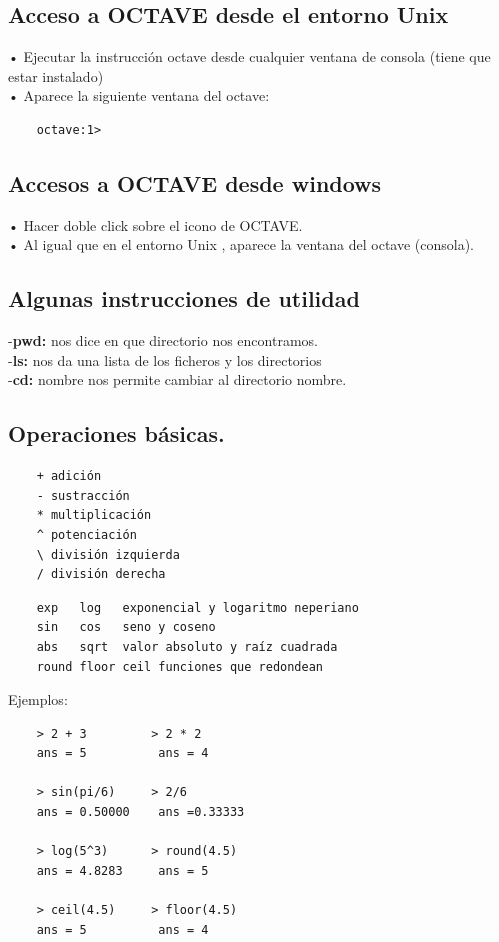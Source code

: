 \documentclass[a4,12pt]{article}
\begin{document}
\subsection{Acceso a OCTAVE desde el entorno Unix}

• Ejecutar la instrucción octave desde cualquier ventana de consola (tiene que estar instalado)\\
• Aparece la siguiente ventana del octave:\\
\begin{verbatim}
    octave:1>
\end{verbatim}

\subsection{Accesos a OCTAVE desde windows}

• Hacer doble click sobre el icono de OCTAVE.\\
• Al igual que en el entorno Unix , aparece la ventana del octave (consola).

\subsection{Algunas instrucciones de utilidad }

-\textbf{pwd:} nos dice en que directorio nos encontramos.\\
-\textbf{ls:} nos da una lista de los ficheros y los directorios\\
-\textbf{cd:} nombre nos permite cambiar al directorio nombre.

\subsection{Operaciones básicas.}

\begin{verbatim}
    + adición
    - sustracción
    * multiplicación
    ^ potenciación
    \ división izquierda
    / división derecha
\end{verbatim}

\begin{verbatim}
    exp   log   exponencial y logaritmo neperiano
    sin   cos   seno y coseno
    abs   sqrt  valor absoluto y raíz cuadrada
    round floor ceil funciones que redondean
\end{verbatim}

Ejemplos:

\begin{verbatim}
    > 2 + 3         > 2 * 2
    ans = 5          ans = 4

    > sin(pi/6)     > 2/6
    ans = 0.50000    ans =0.33333

    > log(5^3)      > round(4.5)
    ans = 4.8283     ans = 5

    > ceil(4.5)     > floor(4.5)
    ans = 5          ans = 4
\end{verbatim}
\end{document}
